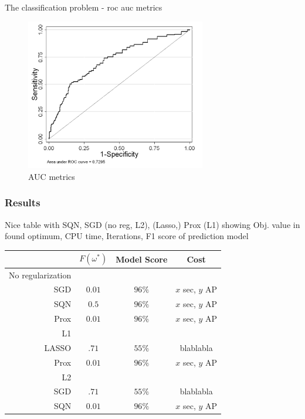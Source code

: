 \documentclass[10pt]{beamer}
\begin{document}
\begin{frame}{The classification problem - roc auc metrics}
\begin{figure}[htbp]
\centering
\includegraphics[width=0.7\textwidth]{auc.png}
\caption{AUC metrics}
\label{default}
\end{figure}
\end{frame}

  \begin{frame}\frametitle{Results}
    Nice table with SQN, SGD (no reg, L2), (Lasso,) Prox (L1) showing
    Obj. value in found optimum, CPU time, Iterations, F1 score of prediction model

    \begin{table}[t]
    \centering
      \begin{tabular}{r|c|c|c}
        \phantom 0 & \textbf{$F(\omega^*)$} & \textbf{Model Score} & \textbf{Cost}\\
      \hline \alert{No regularization}   &      & &  \\
        SGD   & $0.01$  & $96\%$  & $x$ sec, $y$ AP\\
        SQN   & $0.5$  & $96\%$  & $x$ sec, $y$ AP\\
        Prox   & $0.01$  & $96\%$  & $x$ sec, $y$ AP\\
      \hline \hline \alert{L1}        &    &   &  \\
      LASSO & $.71$  &  $55\%$ & blablabla \\
        Prox   & $0.01$  & $96\%$  & $x$ sec, $y$ AP\\
      \hline \hline \alert{L2}        &    &   &  \\
       SGD & $.71$  &  $55\%$ & blablabla \\
        SQN   & $0.01$  & $96\%$  & $x$ sec, $y$ AP\\
      \end{tabular}
    \end{table}
  \end{frame}
\end{document}
